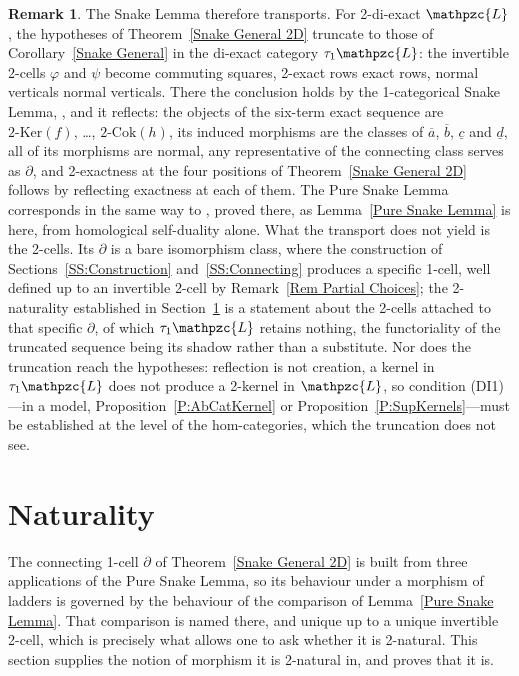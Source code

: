 \documentclass[reqno,a4paper]{amsart}
\numberwithin{equation}{section}
\theoremstyle{plain}
\theoremstyle{definition}
\newtheorem{remark}[subsection]{Remark}
\def\nameit#1{\textrm{#1}~}
\def\thex{\nameit{Theorem}}
\def\prox{\nameit{Proposition}}
\def\corx{\nameit{Corollary}}
\def\lemx{\nameit{Lemma}}
\def\remx{\nameit{Remark}}
\newcommand{\ov}[1]{\overline{#1}}
\def\phi{\varphi}
\newcommand{\catfont}[1]{\ensuremath{\mathpzc{#1}}\xspace}
\def\L{\catfont{L}}
\renewcommand{\1}{\onecat{1}}
\newcommand{\trunc}{\ensuremath{\tau_{1}}}
\newcommand{\TwoKer}{\ensuremath{2\text{-}\mathrm{Ker}}}
\newcommand{\TwoCoker}{\ensuremath{2\text{-}\mathrm{Cok}}}
\begin{document}
\begin{remark}
	The Snake Lemma therefore transports. For 2-di-exact \(\L\), the hypotheses of \thex\ref{Snake General 2D} truncate to those of \corx\ref{Snake General} in the di-exact category \(\trunc\L\): the invertible 2-cells \(\phi\) and \(\psi\) become commuting squares, 2-exact rows exact rows, normal verticals normal verticals. There the conclusion holds by the 1-categorical Snake Lemma, \cite[Theorem~2.2.2 and Corollary~2.2.4]{PVdL3}, and it reflects: the objects of the six-term exact sequence are \(\TwoKer(f)\), \dots, \(\TwoCoker(h)\), its induced morphisms are the classes of \(\ov{a}\), \(\ov{b}\), \(\underline{c}\) and \(\underline{d}\), all of its morphisms are normal, any representative of the connecting class serves as \(\partial\), and 2-exactness at the four positions of \thex\ref{Snake General 2D} follows by reflecting exactness at each of them. The Pure Snake Lemma corresponds in the same way to \cite[Lemma~2.2.1]{PVdL3}, proved there, as \lemx\ref{Pure Snake Lemma} is here, from homological self-duality alone. What the transport does not yield is the 2-cells. Its \(\partial\) is a bare isomorphism class, where the construction of Sections~\ref{SS:Construction} and~\ref{SS:Connecting} produces a specific 1-cell, well defined up to an invertible 2-cell by \remx\ref{Rem Partial Choices}; the 2-naturality established in Section~\ref{S:Naturality} is a statement about the 2-cells attached to that specific \(\partial\), of which \(\trunc\L\) retains nothing, the functoriality of the truncated sequence being its shadow rather than a substitute. Nor does the truncation reach the hypotheses: reflection is not creation, a kernel in \(\trunc\L\) does not produce a 2-kernel in \(\L\), so condition \textup{(DI1)}---in a model, \prox\ref{P:AbCatKernel} or \prox\ref{P:SupKernels}---must be established at the level of the hom-categories, which the truncation does not see.
\end{remark}


\section{Naturality}\label{S:Naturality}

The connecting 1-cell \(\partial\) of \thex\ref{Snake General 2D} is built from three applications of the Pure Snake Lemma, so its behaviour under a morphism of ladders is governed by the behaviour of the comparison of \lemx\ref{Pure Snake Lemma}. That comparison is named there, and unique up to a unique invertible 2-cell, which is precisely what allows one to ask whether it is 2-natural. This section supplies the notion of morphism it is 2-natural in, and proves that it is.
\end{document}
